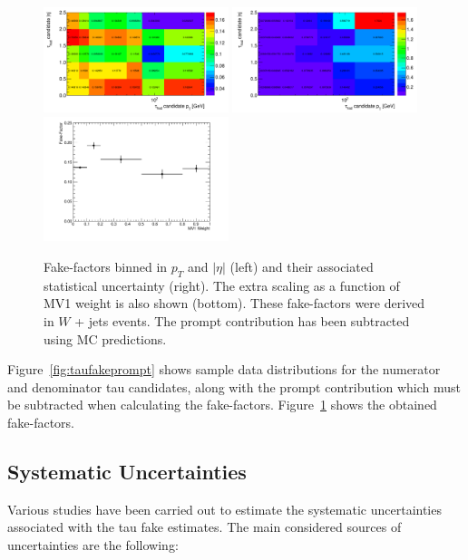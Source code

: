 \begin{figure}
\centering \includegraphics[width=0.48\textwidth]{figures/backgrounds/TauFakes_FFPt}
\centering \includegraphics[width=0.48\textwidth]{figures/backgrounds/TauFakes_FFEta}
\centering \includegraphics[width=0.48\textwidth]{figures/backgrounds/TauFakes_FFMV1}
\caption{\label{fig:taufakefactors} Fake-factors binned in $p_{T}$ and $|\eta|$ (left) and
  their associated statistical uncertainty (right). The extra scaling as a function of MV1
  weight is also shown (bottom).  These fake-factors were derived in $W$ + jets
  events. The prompt contribution has been subtracted using MC predictions.}
\end{figure}

Figure~\ref{fig:taufakeprompt} shows sample data distributions for the numerator and
denominator tau candidates, along with the prompt contribution which must be subtracted
when calculating the fake-factors. Figure~\ref{fig:taufakefactors} shows the obtained
fake-factors.

\subsection{Systematic Uncertainties}\label{sec:model-independent-ff-tau-systematics}

Various studies have been carried out to estimate the systematic uncertainties associated
with the tau fake estimates.  The main considered sources of uncertainties are the following:

